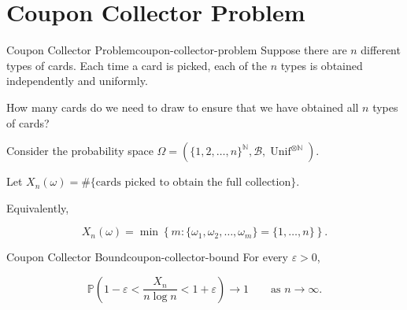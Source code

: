 
\section{Coupon Collector Problem}

\begin{question}{Coupon Collector Problem}{coupon-collector-problem}
Suppose there are $n$ different types of cards. Each time a card is
picked, each of the $n$ types is obtained independently and uniformly.

How many cards do we need to draw to ensure that we have obtained all
$n$ types of cards?
\end{question}

Consider the probability space
\(
    \Omega
    =
    \left(
        \{1,2,\ldots,n\}^{\mathbb{N}},
        \mathcal{B},
        \operatorname{Unif}^{\otimes\mathbb{N}}
    \right).
\)

Let
\(
    X_n(\omega)
    =
    \#\{\text{cards picked to obtain the full collection}\}.
\)

Equivalently,

\[
    X_n(\omega)
    =
    \min
    \left\{
        m:
        \{\omega_1,\omega_2,\ldots,\omega_m\}
        =
        \{1,\ldots,n\}
    \right\}.
\]

\begin{theorem}{Coupon Collector Bound}{coupon-collector-bound}
For every $\varepsilon>0$,

\[
    \mathbb{P}
    \left(
        1-\varepsilon
        <
        \frac{X_n}{n\log n}
        <
        1+\varepsilon
    \right)
    \longrightarrow 1
    \qquad\text{as }n\to\infty.
\]
\end{theorem}

